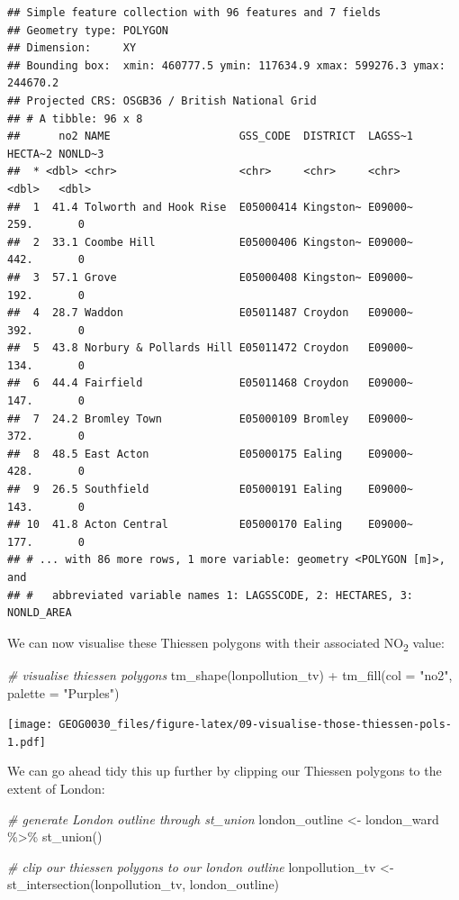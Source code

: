 \documentclass[
]{book}
\newenvironment{Shaded}{\begin{snugshade}}{\end{snugshade}}
\newcommand{\AttributeTok}[1]{\textcolor[rgb]{0.77,0.63,0.00}{#1}}
\newcommand{\CommentTok}[1]{\textcolor[rgb]{0.56,0.35,0.01}{\textit{#1}}}
\newcommand{\FunctionTok}[1]{\textcolor[rgb]{0.00,0.00,0.00}{#1}}
\newcommand{\NormalTok}[1]{#1}
\newcommand{\OtherTok}[1]{\textcolor[rgb]{0.56,0.35,0.01}{#1}}
\newcommand{\SpecialCharTok}[1]{\textcolor[rgb]{0.00,0.00,0.00}{#1}}
\newcommand{\StringTok}[1]{\textcolor[rgb]{0.31,0.60,0.02}{#1}}
\begin{document}
\begin{verbatim}
## Simple feature collection with 96 features and 7 fields
## Geometry type: POLYGON
## Dimension:     XY
## Bounding box:  xmin: 460777.5 ymin: 117634.9 xmax: 599276.3 ymax: 244670.2
## Projected CRS: OSGB36 / British National Grid
## # A tibble: 96 x 8
##      no2 NAME                    GSS_CODE  DISTRICT  LAGSS~1 HECTA~2 NONLD~3
##  * <dbl> <chr>                   <chr>     <chr>     <chr>     <dbl>   <dbl>
##  1  41.4 Tolworth and Hook Rise  E05000414 Kingston~ E09000~    259.       0
##  2  33.1 Coombe Hill             E05000406 Kingston~ E09000~    442.       0
##  3  57.1 Grove                   E05000408 Kingston~ E09000~    192.       0
##  4  28.7 Waddon                  E05011487 Croydon   E09000~    392.       0
##  5  43.8 Norbury & Pollards Hill E05011472 Croydon   E09000~    134.       0
##  6  44.4 Fairfield               E05011468 Croydon   E09000~    147.       0
##  7  24.2 Bromley Town            E05000109 Bromley   E09000~    372.       0
##  8  48.5 East Acton              E05000175 Ealing    E09000~    428.       0
##  9  26.5 Southfield              E05000191 Ealing    E09000~    143.       0
## 10  41.8 Acton Central           E05000170 Ealing    E09000~    177.       0
## # ... with 86 more rows, 1 more variable: geometry <POLYGON [m]>, and
## #   abbreviated variable names 1: LAGSSCODE, 2: HECTARES, 3: NONLD_AREA
\end{verbatim}

We can now visualise these Thiessen polygons with their associated NO\textsubscript{2} value:

\begin{Shaded}
\begin{Highlighting}[]
\CommentTok{\# visualise thiessen polygons}
\FunctionTok{tm\_shape}\NormalTok{(lonpollution\_tv) }\SpecialCharTok{+}
  \FunctionTok{tm\_fill}\NormalTok{(}\AttributeTok{col =} \StringTok{"no2"}\NormalTok{, }\AttributeTok{palette =} \StringTok{"Purples"}\NormalTok{)}
\end{Highlighting}
\end{Shaded}

\texttt{[image: GEOG0030\_files/figure-latex/09-visualise-those-thiessen-pols-1.pdf]}

We can go ahead tidy this up further by clipping our Thiessen polygons to the extent of London:

\begin{Shaded}
\begin{Highlighting}[]
\CommentTok{\# generate London outline through st\_union}
\NormalTok{london\_outline }\OtherTok{\textless{}{-}}\NormalTok{ london\_ward }\SpecialCharTok{\%\textgreater{}\%}
  \FunctionTok{st\_union}\NormalTok{()}

\CommentTok{\# clip our thiessen polygons to our london outline}
\NormalTok{lonpollution\_tv }\OtherTok{\textless{}{-}} \FunctionTok{st\_intersection}\NormalTok{(lonpollution\_tv, london\_outline)}
\end{Highlighting}
\end{Shaded}
\end{document}
